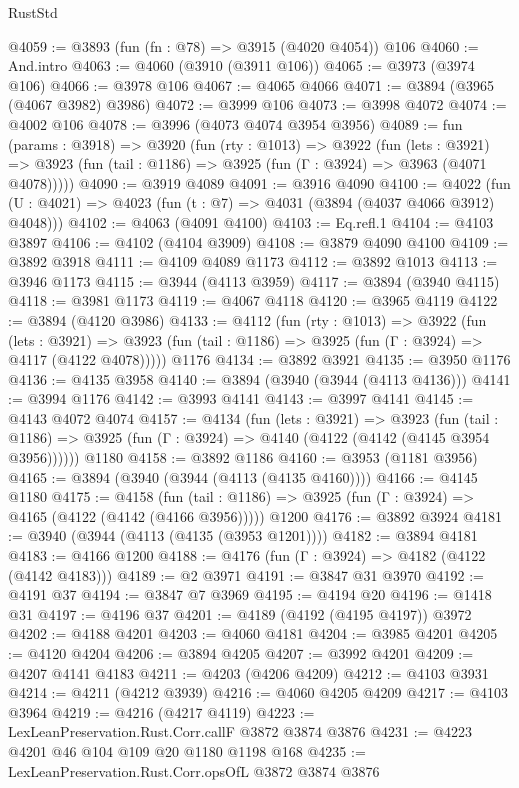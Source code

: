 \begin{lexlean}{RustStd}
\begin{coremodule}
{\begin{coremodule}
{{{{{{{{{{{{{{{{{{{{{{{{{{{{{{{{@4059 := @3893 (fun (fn : @78) => @3915 (@4020 @4054)) @106
@4060 := And.intro
@4063 := @4060 (@3910 (@3911 @106))
@4065 := @3973 (@3974 @106)
@4066 := @3978 @106
@4067 := @4065 @4066
@4071 := @3894 (@3965 (@4067 @3982) @3986)
@4072 := @3999 @106
@4073 := @3998 @4072
@4074 := @4002 @106
@4078 := @3996 (@4073 @4074 @3954 @3956)
@4089 := fun (params : @3918) =>
  @3920
    (fun (rty : @1013) =>
    @3922
      (fun (lets : @3921) =>
      @3923 (fun (tail : @1186) => @3925 (fun (Γ : @3924) => @3963 (@4071 @4078)))))
@4090 := @3919 @4089
@4091 := @3916 @4090
@4100 := @4022 (fun (U : @4021) => @4023 (fun (t : @7) => @4031 (@3894 (@4037 @4066 @3912) @4048)))
@4102 := @4063 (@4091 @4100)
@4103 := Eq.refl.{1}
@4104 := @4103 @3897
@4106 := @4102 (@4104 @3909)
@4108 := @3879 @4090 @4100
@4109 := @3892 @3918
@4111 := @4109 @4089 @1173
@4112 := @3892 @1013
@4113 := @3946 @1173
@4115 := @3944 (@4113 @3959)
@4117 := @3894 (@3940 @4115)
@4118 := @3981 @1173
@4119 := @4067 @4118
@4120 := @3965 @4119
@4122 := @3894 (@4120 @3986)
@4133 := @4112
    (fun (rty : @1013) =>
    @3922
      (fun (lets : @3921) =>
      @3923 (fun (tail : @1186) => @3925 (fun (Γ : @3924) => @4117 (@4122 @4078)))))
    @1176
@4134 := @3892 @3921
@4135 := @3950 @1176
@4136 := @4135 @3958
@4140 := @3894 (@3940 (@3944 (@4113 @4136)))
@4141 := @3994 @1176
@4142 := @3993 @4141
@4143 := @3997 @4141
@4145 := @4143 @4072 @4074
@4157 := @4134
    (fun (lets : @3921) =>
    @3923
      (fun (tail : @1186) => @3925 (fun (Γ : @3924) => @4140 (@4122 (@4142 (@4145 @3954 @3956))))))
    @1180
@4158 := @3892 @1186
@4160 := @3953 (@1181 @3956)
@4165 := @3894 (@3940 (@3944 (@4113 (@4135 @4160))))
@4166 := @4145 @1180
@4175 := @4158
    (fun (tail : @1186) => @3925 (fun (Γ : @3924) => @4165 (@4122 (@4142 (@4166 @3956)))))
    @1200
@4176 := @3892 @3924
@4181 := @3940 (@3944 (@4113 (@4135 (@3953 @1201))))
@4182 := @3894 @4181
@4183 := @4166 @1200
@4188 := @4176 (fun (Γ : @3924) => @4182 (@4122 (@4142 @4183)))
@4189 := @2 @3971
@4191 := @3847 @31 @3970
@4192 := @4191 @37
@4194 := @3847 @7 @3969
@4195 := @4194 @20
@4196 := @1418 @31
@4197 := @4196 @37
@4201 := @4189 (@4192 (@4195 @4197)) @3972
@4202 := @4188 @4201
@4203 := @4060 @4181
@4204 := @3985 @4201
@4205 := @4120 @4204
@4206 := @3894 @4205
@4207 := @3992 @4201
@4209 := @4207 @4141 @4183
@4211 := @4203 (@4206 @4209)
@4212 := @4103 @3931
@4214 := @4211 (@4212 @3939)
@4216 := @4060 @4205 @4209
@4217 := @4103 @3964
@4219 := @4216 (@4217 @4119)
@4223 := LexLeanPreservation.Rust.Corr.callF @3872 @3874 @3876
@4231 := @4223 @4201 @46 @104 @109 @20 @1180 @1198 @168
@4235 := LexLeanPreservation.Rust.Corr.opsOfL @3872 @3874 @3876
}}}}}}}}}}}}}}}}}}}}}}}}}}}}}}}}
\end{coremodule}}
\end{coremodule}
\end{lexlean}
